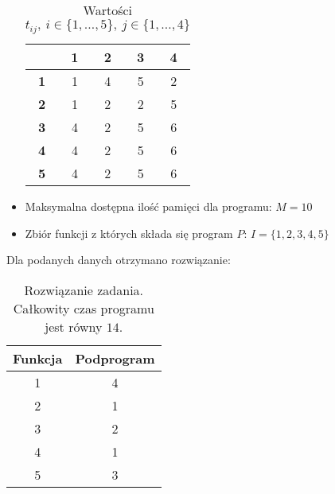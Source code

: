 \documentclass{article}
\begin{document}
\begin{itemize}
\begin{table}[H]
                \begin{center}
                    \begin{tabular}{c||c|c|c|c}
                        & \textbf{1} & \textbf{2} & \textbf{3} & \textbf{4} \\ 
                        \hline
                        \hline
                        \textbf{1} & 1 & 4 & 5 & 2 \\
                        \hline
                        \textbf{2} & 1 & 2 & 2 & 5 \\
                        \hline
                        \textbf{3} & 4 & 2 & 5 & 6 \\
                        \hline
                        \textbf{4} & 4 & 2 & 5 & 6 \\
                        \hline
                        \textbf{5} & 4 & 2 & 5 & 6 \\
                    \end{tabular}
                    \caption{Wartości $t_{ij},\ i \in \{1, \dots, 5\},\ j \in \{1, \dots, 4\}$}
                    \label{tab2}
                \end{center}
            \end{table}
        \item Maksymalna dostępna ilość pamięci dla programu: $M = 10$
        \item Zbiór funkcji z których składa się program $P$: $I = \{1, 2, 3, 4, 5\}$
    \end{itemize}

    Dla podanych danych otrzymano rozwiązanie:

    \begin{table}[H]
        \begin{center}
            \begin{tabular}{c|c}
                \textbf{Funkcja} & \textbf{Podprogram} \\ 
                \hline
                1 & 4 \\
                2 & 1 \\
                3 & 2 \\
                4 & 1 \\
                5 & 3 \\
            \end{tabular}
            \caption{Rozwiązanie zadania. Całkowity czas programu jest równy $14$.}
            \label{tab3}
        \end{center}
    \end{table}
\end{document}
